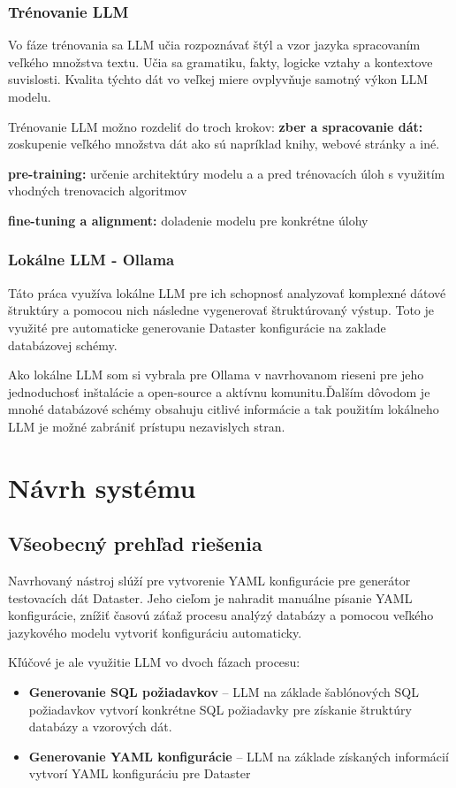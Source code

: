 \subsection{Trénovanie LLM}
Vo fáze trénovania sa LLM učia rozpoznávať štýl a vzor jazyka spracovaním veľkého množstva textu. Učia sa gramatiku, fakty, logicke vztahy a kontextove suvislosti.
Kvalita týchto dát vo veľkej miere ovplyvňuje samotný výkon LLM modelu.\cite{Zhao2024}

Trénovanie LLM možno rozdeliť do troch krokov:\cite{Zhao2024}
\textbf{zber a spracovanie dát:} zoskupenie veľkého množstva dát ako sú napríklad knihy, webové stránky a iné.

\textbf{pre-training:} určenie architektúry modelu a a pred trénovacích úloh s využitím vhodných trenovacich algoritmov


\textbf{fine-tuning a alignment:} doladenie modelu pre konkrétne úlohy

\subsection{Lokálne LLM - Ollama}

Táto práca využíva lokálne LLM pre ich schopnosť analyzovať komplexné dátové štruktúry a pomocou nich následne vygenerovať štruktúrovaný výstup. Toto je využité pre automaticke generovanie Dataster konfigurácie na zaklade databázovej schémy.

Ako lokálne LLM som si vybrala pre Ollama v navrhovanom rieseni pre jeho jednoduchosť inštalácie a open-source a aktívnu komunitu.Ďalším dôvodom je mnohé databázové schémy obsahuju citlivé informácie a tak použitím lokálneho LLM je možné zabrániť prístupu nezavislych stran.

\chapter{Návrh systému}

\section{Všeobecný prehľad riešenia}

Navrhovaný nástroj slúží pre vytvorenie YAML konfigurácie pre generátor testovacích dát Dataster. Jeho cieľom je nahradit manuálne písanie YAML konfigurácie, znížiť časovú záťaž procesu analýzý  databázy a pomocou veľkého jazykového modelu vytvoriť konfiguráciu automaticky.

Kľúčové je ale využitie LLM vo dvoch fázach procesu:
\begin{itemize}
    \item \textbf{Generovanie SQL požiadavkov} --   LLM na základe šablónových SQL požiadavkov vytvorí konkrétne SQL požiadavky pre získanie štruktúry databázy a vzorových dát.
    \item \textbf{Generovanie YAML konfigurácie} -- LLM na základe získaných informácií vytvorí YAML konfiguráciu pre Dataster
\end{itemize}


